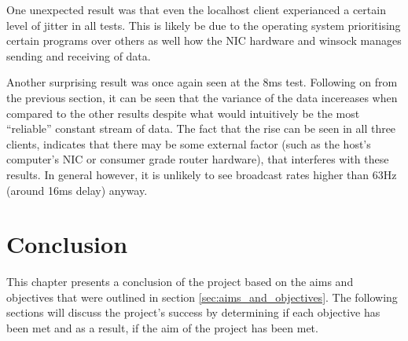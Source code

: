 One unexpected result was that even the localhost client experianced a certain level of jitter in all tests. This is likely be due to the operating system prioritising certain programs over others as well how the NIC hardware and winsock manages sending and receiving of data.

Another surprising result was once again seen at the 8ms test. Following on from the previous section, it can be seen that the variance of the data incereases when compared to the other results despite what would intuitively be the most ``reliable'' constant stream of data. The fact that the rise can be seen in all three clients, indicates that there may be some external factor (such as the host's computer's NIC or consumer grade router hardware), that interferes with these results. In general however, it is unlikely to see broadcast rates higher than 63Hz (around 16ms delay) anyway.



\chapter{Conclusion}
This chapter presents a conclusion of the project based on the aims and objectives that were outlined in section \ref{sec:aims_and_objectives}. The following sections will discuss the project's success by determining if each objective has been met and as a result, if the aim of the project has been met.

